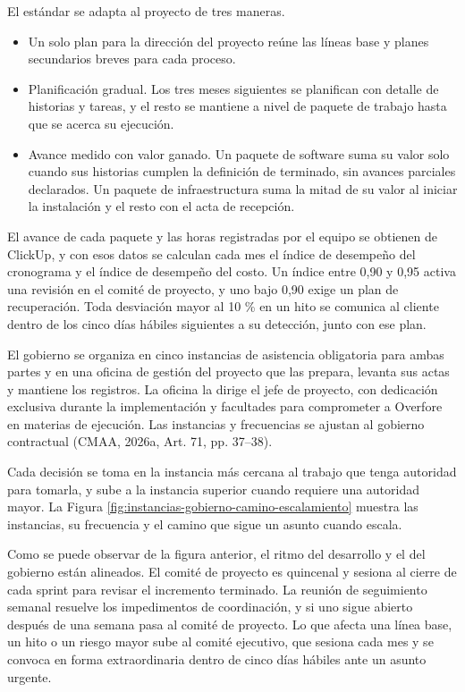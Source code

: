 \documentclass[subdoc]{../../comun/overfore}
\begin{document}
El estándar se adapta al proyecto de tres maneras.

\begin{itemize}
\item Un solo plan para la dirección del proyecto reúne las líneas base y planes secundarios breves para cada proceso.
\item Planificación gradual. Los tres meses siguientes se planifican con detalle de historias y tareas, y el resto se mantiene a nivel de paquete de trabajo hasta que se acerca su ejecución.
\item Avance medido con valor ganado. Un paquete de software suma su valor solo cuando sus historias cumplen la definición de terminado, sin avances parciales declarados. Un paquete de infraestructura suma la mitad de su valor al iniciar la instalación y el resto con el acta de recepción.
\end{itemize}
El avance de cada paquete y las horas registradas por el equipo se obtienen de ClickUp, y con esos datos se calculan cada mes el índice de desempeño del cronograma y el índice de desempeño del costo. Un índice entre 0,90 y 0,95 activa una revisión en el comité de proyecto, y uno bajo 0,90 exige un plan de recuperación. Toda desviación mayor al 10 \% en un hito se comunica al cliente dentro de los cinco días hábiles siguientes a su detección, junto con ese plan.

El gobierno se organiza en cinco instancias de asistencia obligatoria para ambas partes y en una oficina de gestión del proyecto que las prepara, levanta sus actas y mantiene los registros. La oficina la dirige el jefe de proyecto, con dedicación exclusiva durante la implementación y facultades para comprometer a Overfore en materias de ejecución. Las instancias y frecuencias se ajustan al gobierno contractual (CMAA, 2026a, Art. 71, pp. 37–38).

Cada decisión se toma en la instancia más cercana al trabajo que tenga autoridad para tomarla, y sube a la instancia superior cuando requiere una autoridad mayor. La Figura \ref{fig:instancias-gobierno-camino-escalamiento} muestra las instancias, su frecuencia y el camino que sigue un asunto cuando escala.

Como se puede observar de la figura anterior, el ritmo del desarrollo y el del gobierno están alineados. El comité de proyecto es quincenal y sesiona al cierre de cada sprint para revisar el incremento terminado. La reunión de seguimiento semanal resuelve los impedimentos de coordinación, y si uno sigue abierto después de una semana pasa al comité de proyecto. Lo que afecta una línea base, un hito o un riesgo mayor sube al comité ejecutivo, que sesiona cada mes y se convoca en forma extraordinaria dentro de cinco días hábiles ante un asunto urgente.
\end{document}
